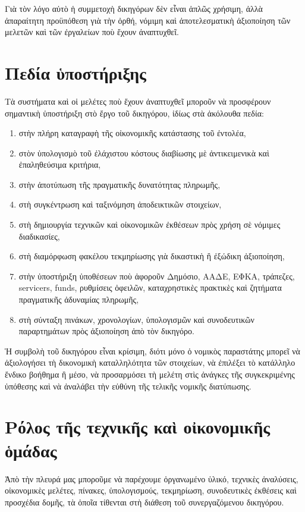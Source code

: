 \documentclass[12pt,a4paper]{article}
\begin{document}
Γιὰ τὸν λόγο αὐτὸ ἡ συμμετοχὴ δικηγόρων δὲν εἶναι ἁπλῶς χρήσιμη, ἀλλὰ ἀπαραίτητη προϋπόθεση γιὰ τὴν ὀρθή, νόμιμη καὶ ἀποτελεσματικὴ ἀξιοποίηση τῶν μελετῶν καὶ τῶν ἐργαλείων ποὺ ἔχουν ἀναπτυχθεῖ. 

\section{Πεδία ὑποστήριξης} 

Τὰ συστήματα καὶ οἱ μελέτες ποὺ ἔχουν ἀναπτυχθεῖ μποροῦν νὰ προσφέρουν σημαντικὴ ὑποστήριξη στὸ ἔργο τοῦ δικηγόρου, ἰδίως στὰ ἀκόλουθα πεδία: 

\begin{enumerate}[label=\alph*)] 
	\item στὴν πλήρη καταγραφὴ τῆς οἰκονομικῆς κατάστασης τοῦ ἐντολέα, 
	\item στὸν ὑπολογισμὸ τοῦ ἐλάχιστου κόστους διαβίωσης μὲ ἀντικειμενικὰ καὶ ἐπαληθεύσιμα κριτήρια, 
	\item στὴν ἀποτύπωση τῆς πραγματικῆς δυνατότητας πληρωμῆς, 
	\item στὴ συγκέντρωση καὶ ταξινόμηση ἀποδεικτικῶν στοιχείων, 
	\item στὴ δημιουργία τεχνικῶν καὶ οἰκονομικῶν ἐκθέσεων πρὸς χρήση σὲ νόμιμες διαδικασίες, 
	\item στὴ διαμόρφωση φακέλου τεκμηρίωσης γιὰ δικαστικὴ ἢ ἐξώδικη ἀξιοποίηση, 
	\item στὴν ὑποστήριξη ὑποθέσεων ποὺ ἀφοροῦν Δημόσιο, ΑΑΔΕ, ΕΦΚΑ, τράπεζες, servicers, funds, ρυθμίσεις ὀφειλῶν, καταχρηστικὲς πρακτικὲς καὶ ζητήματα πραγματικῆς ἀδυναμίας πληρωμῆς, 
	\item στὴ σύνταξη πινάκων, χρονολογίων, ὑπολογισμῶν καὶ συνοδευτικῶν παραρτημάτων πρὸς ἀξιοποίηση ἀπὸ τὸν δικηγόρο. 
\end{enumerate} 

Ἡ συμβολὴ τοῦ δικηγόρου εἶναι κρίσιμη, διότι μόνο ὁ νομικὸς παραστάτης μπορεῖ νὰ ἀξιολογήσει τὴ δικονομικὴ καταλληλότητα τῶν στοιχείων, νὰ ἐπιλέξει τὸ κατάλληλο ἔνδικο βοήθημα ἢ μέσο, νὰ προσαρμόσει τὴ μελέτη στὶς ἀνάγκες τῆς συγκεκριμένης ὑπόθεσης καὶ νὰ ἀναλάβει τὴν εὐθύνη τῆς τελικῆς νομικῆς διατύπωσης. 

\section{Ρόλος τῆς τεχνικῆς καὶ οἰκονομικῆς ὁμάδας} 

Ἀπὸ τὴν πλευρά μας μποροῦμε νὰ παρέχουμε ὀργανωμένο ὑλικό, τεχνικὲς ἀναλύσεις, οἰκονομικὲς μελέτες, πίνακες, ὑπολογισμούς, τεκμηρίωση, συνοδευτικὲς ἐκθέσεις καὶ προσχέδια δομῆς, τὰ ὁποῖα τίθενται στὴ διάθεση τοῦ συνεργαζόμενου δικηγόρου. 
\end{document}
